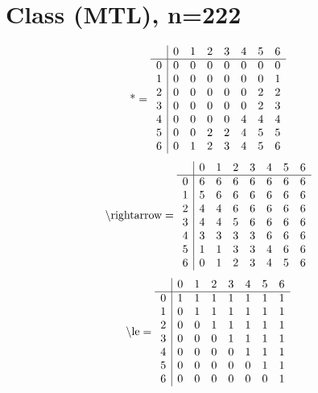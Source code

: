 \documentclass[11pt]{article}
\begin{document}
\section{Class (MTL), n=222}
\[\text{*} = 
\begin{array}{r | r r r r r r r}
 & 0 & 1 & 2 & 3 & 4 & 5 & 6 \\ \hline
0 & 0 & 0 & 0 & 0 & 0 & 0 & 0 \\
1 & 0 & 0 & 0 & 0 & 0 & 0 & 1 \\
2 & 0 & 0 & 0 & 0 & 0 & 2 & 2 \\
3 & 0 & 0 & 0 & 0 & 0 & 2 & 3 \\
4 & 0 & 0 & 0 & 0 & 4 & 4 & 4 \\
5 & 0 & 0 & 2 & 2 & 4 & 5 & 5 \\
6 & 0 & 1 & 2 & 3 & 4 & 5 & 6 \\
\end{array}
\]
\[\text{\textbackslash rightarrow} = 
\begin{array}{r | r r r r r r r}
 & 0 & 1 & 2 & 3 & 4 & 5 & 6 \\ \hline
0 & 6 & 6 & 6 & 6 & 6 & 6 & 6 \\
1 & 5 & 6 & 6 & 6 & 6 & 6 & 6 \\
2 & 4 & 4 & 6 & 6 & 6 & 6 & 6 \\
3 & 4 & 4 & 5 & 6 & 6 & 6 & 6 \\
4 & 3 & 3 & 3 & 3 & 6 & 6 & 6 \\
5 & 1 & 1 & 3 & 3 & 4 & 6 & 6 \\
6 & 0 & 1 & 2 & 3 & 4 & 5 & 6 \\
\end{array}
\]
\[\text{\textbackslash le} = 
\begin{array}{r | r r r r r r r}
 & 0 & 1 & 2 & 3 & 4 & 5 & 6 \\ \hline
0 & 1 & 1 & 1 & 1 & 1 & 1 & 1 \\
1 & 0 & 1 & 1 & 1 & 1 & 1 & 1 \\
2 & 0 & 0 & 1 & 1 & 1 & 1 & 1 \\
3 & 0 & 0 & 0 & 1 & 1 & 1 & 1 \\
4 & 0 & 0 & 0 & 0 & 1 & 1 & 1 \\
5 & 0 & 0 & 0 & 0 & 0 & 1 & 1 \\
6 & 0 & 0 & 0 & 0 & 0 & 0 & 1 \\
\end{array}
\]
\end{document}
